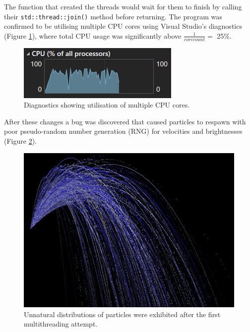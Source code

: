 \documentclass[11pt, a4paper, twocolumn]{article}
\begin{document}
The function that created the threads would wait for them to finish by calling their \verb|std::thread::join()| method before returning. The program was confirmed to be utilising multiple CPU cores using Visual Studio's diagnostics (Figure \ref{fig:multithread-diagnostics}), where total CPU usage was significantly above $\frac{1}{core count}=$ 25\%.

\begin{figure}[h]
\includegraphics[width=\linewidth]{multithread-diagnostics}
\caption{Diagnostics showing utilisation of multiple CPU cores.}
\label{fig:multithread-diagnostics}
\end{figure}

After these changes a bug was discovered that caused particles to respawn with poor pseudo-random number generation (RNG) for velocities and brightnesses (Figure \ref{fig:randombug}).

\begin{figure}[h]
\includegraphics[width=\linewidth]{randombug}
\caption{Unnatural distributions of particles were exhibited after the first multithreading attempt.}
\label{fig:randombug}
\end{figure}
\end{document}
